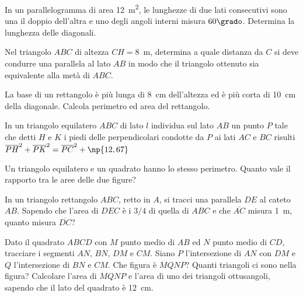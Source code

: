 \begin{multicols}{2}
\begin{esercizio}
\label{ese:7.36}
In un parallelogramma di area 12~m\textsuperscript{2}, le lunghezze 
di due lati consecutivi sono una il doppio dell'altra e uno degli 
angoli interni misura $60\grado$. Determina la lunghezza delle 
diagonali.
\end{esercizio}

\begin{esercizio}
\label{ese:7.37}
Nel triangolo $ABC$ di altezza $CH=8$~m, determina a quale distanza 
da $C$ si deve condurre una parallela al lato $AB$ in modo che il 
triangolo ottenuto sia equivalente alla metà di $ABC$.
\end{esercizio}

\begin{esercizio}
\label{ese:7.38}
La base di un rettangolo è più lunga di 8~cm dell'altezza ed è più 
corta di 10~cm della diagonale. Calcola perimetro ed area del 
rettangolo. 			
\end{esercizio}

\begin{esercizio}
\label{ese:7.39}
In un triangolo equilatero $ABC$ di lato $l$ individua sul lato $AB$ 
un punto $P$ tale che detti $H$ e $K$ i piedi delle perpendicolari 
condotte da $P$ ai lati $AC$ e $BC$ risulti 
$\overline{PH}^2+\overline{PK}^2=\overline{PC}^2+\np{12,67}$
\end{esercizio}

\begin{esercizio}
\label{ese:7.40}
Un triangolo equilatero e un quadrato hanno lo stesso perimetro. 
Quanto vale il rapporto tra le aree delle due figure?
\end{esercizio}

\begin{esercizio}
\label{ese:7.41}
In un triangolo rettangolo $ABC$, retto in $A$, si tracci una 
parallela $DE$ al cateto $AB$. Sapendo che l'area di $DEC$ è i $3/4$ 
di quella di $ABC$ e che $\overline{AC}$ misura 1~m, quanto misura 
$\overline{DC}$?
\end{esercizio}

\begin{esercizio}
\label{ese:7.42}
Dato il quadrato $ABCD$ con $M$ punto medio di $AB$ ed $N$ punto 
medio di $CD$, tracciare i segmenti $AN$, $BN$, $DM$ e $CM$. Siano 
$P$ l'intersezione di $AN$ con $DM$ e $Q$ l'intersezione di $BN$ e 
$CM$. Che figura è $MQNP$? Quanti triangoli ci sono nella figura? 
Calcolare l'area di $MQNP$ e l'area di uno dei triangoli ottusangoli, 
sapendo che il lato del quadrato è 12~cm.
\end{esercizio}


\end{multicols}
